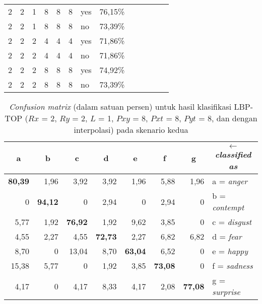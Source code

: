 \documentclass[review,3p,12pt,times]{elsarticle}
\begin{document}
\begin{table}[htbp!]
\begin{tabular}{C{0.7cm}C{0.7cm}C{0.7cm}C{0.7cm}C{0.7cm}C{0.7cm}C{0.7cm}rC{0.7cm}C{0.7cm}C{0.7cm}C{0.7cm}r}
    2     & 2     & 1     & 8     & 8     & 8     & yes   & 76,15\% &       &       &       &       &  \\
    2     & 2     & 1     & 8     & 8     & 8     & no    & 73,39\% &       &       &       &       &  \\
    2     & 2     & 2     & 4     & 4     & 4     & yes   & 71,86\% &       &       &       &       &  \\
    2     & 2     & 2     & 4     & 4     & 4     & no    & 71,86\% &       &       &       &       &  \\
    2     & 2     & 2     & 8     & 8     & 8     & yes   & 74,92\% &       &       &       &       &  \\
    2     & 2     & 2     & 8     & 8     & 8     & no    & 73,39\% &       &       &       &       &  \\
    \bottomrule
    \end{tabular}%
  
\end{table}%

\begin{table}[htbp]
  \centering
  \caption{\textit{Confusion matrix} (dalam satuan persen) untuk hasil klasifikasi LBP-TOP ($Rx$ = 2, $Ry$ = 2, $L$ = 1, $Pxy$ = 8, $Pxt$ = 8, $Pyt$ = 8, dan dengan interpolasi) pada skenario kedua}
  \label{tab:confusion2}%
    \begin{tabular}{rrrrrrrl}
    \toprule
    \multicolumn{1}{c}{a} & \multicolumn{1}{c}{b} & \multicolumn{1}{c}{c} & \multicolumn{1}{c}{d} & \multicolumn{1}{c}{e} & \multicolumn{1}{c}{f} & \multicolumn{1}{c}{g} & \multicolumn{1}{c}{$\leftarrow$\textit{classified as}} \\
    \midrule
    \textbf{80,39 }& 1,96  & 3,92  & 3,92  & 1,96  & 5,88  & 1,96  & a = \textit{anger} \\
    0     & \textbf{94,12} & 0     & 2,94  & 0     & 2,94  & 0     & b = \textit{contempt} \\
    5,77  & 1,92  & \textbf{76,92} & 1,92  & 9,62  & 3,85  & 0     & c = \textit{disgust} \\
    4,55  & 2,27  & 4,55  & \textbf{72,73} & 2,27  & 6,82  & 6,82  & d = \textit{fear} \\
    8,70  & 0     & 13,04 & 8,70  & \textbf{63,04} & 6,52  & 0     & e = \textit{happy} \\
    15,38 & 5,77  & 0     & 1,92  & 3,85  & \textbf{73,08} & 0     & f = \textit{sadness} \\
    4,17  & 0     & 4,17  & 8,33  & 4,17  & 2,08  & \textbf{77,08} & g = \textit{surprise} \\
    \bottomrule
    \end{tabular}%
  
\end{table}%
\end{document}

